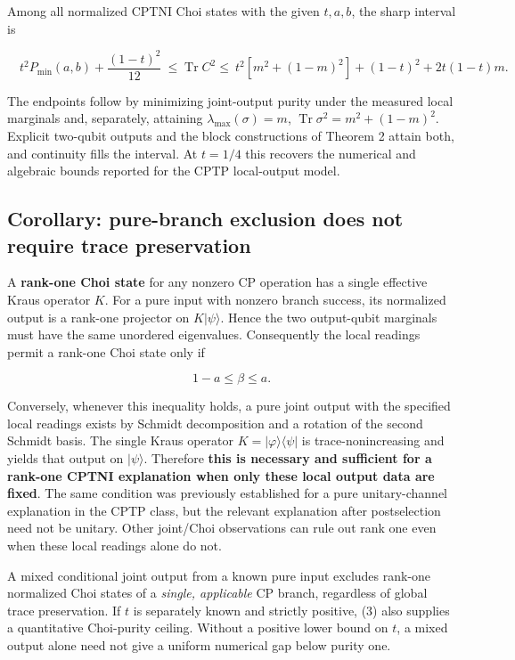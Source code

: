 \documentclass[
  10pt,
  a4paper,
]{article}
\begin{document}
Among all normalized CPTNI Choi states with the given \(t,a,b\), the sharp interval is

\[
\boxed{\quad t^2P_{\min}(a,b)+\frac{(1-t)^2}{12}
\ \le\operatorname{Tr}C^2\le\
t^2[m^2+(1-m)^2]+(1-t)^2+2t(1-t)m.\quad}
\tag{4}
\]

The endpoints follow by minimizing joint-output purity under the measured local marginals and, separately, attaining \(\lambda_{\max}(\sigma)=m\), \(\operatorname{Tr}\sigma^2=m^2+(1-m)^2\). Explicit two-qubit outputs and the block constructions of Theorem 2 attain both, and continuity fills the interval. At \(t=1/4\) this recovers the numerical and algebraic bounds reported for the CPTP local-output model.

\subsection{Corollary: pure-branch exclusion does not require trace preservation}\label{corollary-pure-branch-exclusion-does-not-require-trace-preservation}

A \textbf{rank-one Choi state} for any nonzero CP operation has a single effective Kraus operator \(K\). For a pure input with nonzero branch success, its normalized output is a rank-one projector on \(K|\psi\rangle\). Hence the two output-qubit marginals must have the same unordered eigenvalues. Consequently the local readings permit a rank-one Choi state only if

\[\boxed{\quad 1-a\le \beta\le a.\quad}\]

Conversely, whenever this inequality holds, a pure joint output with the specified local readings exists by Schmidt decomposition and a rotation of the second Schmidt basis. The single Kraus operator \(K=|\varphi\rangle\langle\psi|\) is trace-nonincreasing and yields that output on \(|\psi\rangle\). Therefore \textbf{this is necessary and sufficient for a rank-one CPTNI explanation when only these local output data are fixed}. The same condition was previously established for a pure unitary-channel explanation in the CPTP class, but the relevant explanation after postselection need not be unitary. Other joint/Choi observations can rule out rank one even when these local readings alone do not.

A mixed conditional joint output from a known pure input excludes rank-one normalized Choi states of a \emph{single, applicable} CP branch, regardless of global trace preservation. If \(t\) is separately known and strictly positive, (3) also supplies a quantitative Choi-purity ceiling. Without a positive lower bound on \(t\), a mixed output alone need not give a uniform numerical gap below purity one.
\end{document}
